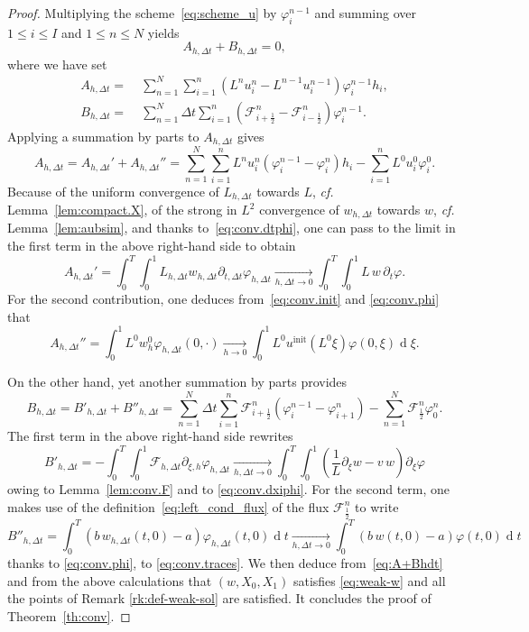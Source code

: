 \documentclass{amsart}
\newcommand\dd{{\operatorname{d}}}
\newcommand\dt{\Delta t}
\newcommand\Fluxnum[1]{\mathcal{F}_{#1 \frac{1}{2}}^n}
\newcommand\Ff{{\mathcal F}}
\newcommand\p{\partial}
\begin{document}
\begin{proof}
Multiplying the scheme~\eqref{eq:scheme_u} by $\varphi_i^{n-1}$ 
and summing over $1 \leq i \leq I$ and $1 \leq n \leq N$ yields 
\begin{equation}\label{eq:A+Bhdt}
A_{h,\dt} + B_{h,\dt}  = 0, 
\end{equation}
where we have set 
\begin{align*}
    A_{h,\dt} =\;& \sum_{n=1}^N \sum_{i=1}^n (L^n u_i^n - L^{n-1}u_i^{n-1})\varphi_i^{n-1}h_i, \\
    B_{h,\dt} = \;& \sum_{n=1}^N \dt \sum_{i=1}^n \left( \Fluxnum{i+} - \Fluxnum{i-} \right)  \varphi_i^{n-1}.
\end{align*}
Applying a summation by parts to $A_{h,\dt}$ gives 
\[
A_{h,\dt} = A_{h,\dt}' + A_{h,\dt}'' = \sum_{n=1}^N \sum_{i=1}^n L^n u_i^n (\varphi_i^{n-1} - \varphi_i^n) h_i - \sum_{i=1}^n L^0 u_i^0 \varphi_i^0.
\]
Because of the uniform convergence of $L_{h,\dt}$ towards $L$, {\em cf.} Lemma~\ref{lem:compact.X}, of the strong in $L^2$ convergence 
of $w_{h,\dt}$ towards $w$, {\em cf.} Lemma~\ref{lem:aubsim}, and thanks to~\eqref{eq:conv.dtphi}, one can pass to the limit in the first term in the above right-hand side  to obtain 
\[
A_{h,\dt}' =  \int_0^T \int_0^1 L_{h,\dt} w_{h,\dt} \p_{t,\dt} \varphi_{h,\dt}  \underset{h,\dt \to 0} \longrightarrow  \int_0^T \int_0^1 L\, w\, \p_t\varphi. 
\]
For the second contribution, one deduces from~\eqref{eq:conv.init} and \eqref{eq:conv.phi} that 
\[
A_{h,\dt}'' =  \int_0^1 L^0 w_h^0 \varphi_{h,\dt}(0,\cdot)   \underset{h \to 0}\longrightarrow  \int_0^1 L^0 u^\text{init}(L^0 \xi)  \varphi(0,\xi) \dd \xi.
\]

On the other hand, yet another summation by parts provides 
\[
 B_{h,\dt} = B'_{h,\dt} +  B''_{h,\dt} = \sum_{n=1}^N \dt \sum_{i=1}^n \Fluxnum{i+} \left(\varphi_i^{n-1} - \varphi_{i+1}^n\right) - \sum_{n=1}^N \Ff_{\frac12}^n \varphi_0^n.
\]
The first term in the above right-hand side rewrites 
\[
B'_{h,\dt} = - \int_0^T \int_0^1 \Ff_{h,\dt} \p_{\xi,h} \varphi_{h,\dt} 
\underset{h,\dt \to 0}\longrightarrow   \int_0^T \int_0^1\left (\frac1L\p_\xi w - v\, w\right) \p_\xi \varphi
\]
owing to Lemma~\ref{lem:conv.F} and to \eqref{eq:conv.dxiphi}. For the second term, one makes use of the definition~\eqref{eq:left_cond_flux} of the flux $\Ff_{\frac12}^n$ 
to write 
$$
B''_{h,\dt}  = \int_0^T (b\, w_{h,\dt}(t,0) - a) \varphi_{h,\dt}(t,0) \dd t \underset{h,\dt \to 0}\longrightarrow  \int_0^T (b\, w(t,0) - a) \varphi(t,0)\dd t
$$
thanks to  \eqref{eq:conv.phi}, to \eqref{eq:conv.traces}.
We then deduce from~\eqref{eq:A+Bhdt} and from the above calculations that $(w,X_0,X_1)$ satisfies \eqref{eq:weak-w} and all the points of Remark \ref{rk:def-weak-sol} are satisfied. It concludes the proof of Theorem~\ref{th:conv}.
\end{proof}	
\end{document}

